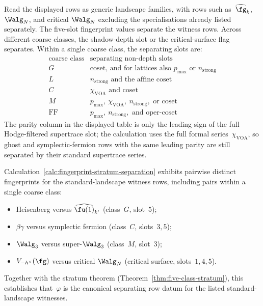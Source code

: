\begin{calculation}
\label{calc:fingerprint-stratum-separation}
Read the displayed rows as generic landscape families, with rows such
as~$\widehat{\fg}_k$, $\Walg_N$, and critical $\Walg_N$ excluding the
specialisations already listed separately. The five-slot fingerprint
values separate the witness rows. Across different coarse classes, the
shadow-depth slot or the critical-surface flag separates. Within a
single coarse class, the separating slots are:
\[
\begin{array}{c|c}
\text{coarse class} & \text{separating non-depth slots}\\
\hline
G & \mathrm{coset}\text{, and for lattices also }p_{\max}
\text{ or }n_{\mathrm{strong}}\\
L & n_{\mathrm{strong}}\text{ and the affine coset}\\
C & \chi_{\mathrm{VOA}}\text{ and } \mathrm{coset}\\
M & p_{\max},\ \chi_{\mathrm{VOA}},\ n_{\mathrm{strong}},
\text{ or } \mathrm{coset}\\
\mathrm{FF} & p_{\max},\ n_{\mathrm{strong}},\text{ and oper-coset}
\end{array}
\]
The parity column in the displayed table is only the leading sign of
the full Hodge-filtered supertrace slot; the calculation uses the full
formal series~$\chi_{\mathrm{VOA}}$, so ghost and symplectic-fermion
rows with the same leading parity are still separated by their
standard supertrace series.
\end{calculation}

\begin{corollary}
\label{cor:fingerprint-separates-landscape}
\ClaimStatusProvedHere
Calculation~\ref{calc:fingerprint-stratum-separation} exhibits
pairwise distinct fingerprints for the standard-landscape witness
rows, including pairs within a single coarse class:
\begin{itemize}[nosep]
\item Heisenberg versus $\widehat{\fu(1)}_{k'}$ (class~$G$,
	slot~$5$);
\item $\beta\gamma$ versus symplectic fermion (class~$C$, slots~$3,5$);
\item $\Walg_3$ versus super-$\Walg_3$ (class~$M$, slot~$3$);
\item $V_{-h^\vee}(\fg)$ versus critical $\Walg_N$
	(critical surface, slots~$1,4,5$).
\end{itemize}
Together with the stratum theorem
\textup{(}Theorem~\ref{thm:five-class-stratum}\textup{)}, this
establishes that~$\varphi$ is the canonical separating row datum for
the listed standard-landscape witnesses.
\end{corollary}

